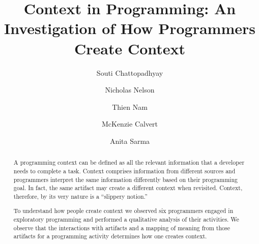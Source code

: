 \documentclass[sigconf]{acmart}
\begin{document}
\title{Context in Programming: An Investigation of How Programmers Create Context}

\author{Souti Chattopadhyay}

\author{Nicholas Nelson}

\author{Thien Nam}

\author{McKenzie Calvert}

\author{Anita Sarma}

\renewcommand{\shortauthors}{S. Chattopadhyay et al.}


\begin{abstract}
A programming context can be defined as all the relevant information that a developer needs to complete a task. Context comprises information from different sources and programmers interpret the same information differently based on their programming goal. In fact, the same artifact may create a different context when revisited. Context, therefore, by its very nature is a ``slippery notion.''

To understand how people create context we observed six programmers engaged in exploratory programming and performed a qualitative analysis of their activities. We observe that the interactions with artifacts and a mapping of meaning from those artifacts for a programming activity determines how one creates context.
\end{abstract}

%
%
\end{document}

